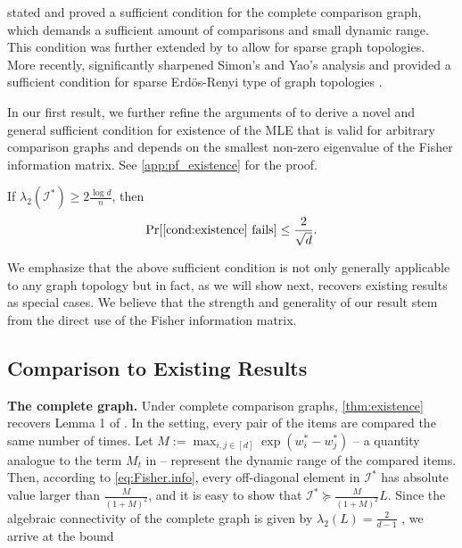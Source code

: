 \citet{simons1999asymptotics} stated and proved a sufficient condition for the complete comparison graph, which demands a sufficient amount of comparisons and small dynamic range. This condition was further  extended by \cite{yan2012sparse} to allow for sparse graph topologies. More recently, \cite{han2020asymptotic} significantly sharpened Simon's and Yao's analysis and provided a sufficient condition for sparse Erd\"{o}s-Renyi type of graph topologies \citep{erdHos1960evolution}. 

In our first result, we further refine the arguments of \citet{simons1999asymptotics} to derive a novel and general sufficient condition for existence of the MLE that is valid for arbitrary comparison graphs and depends on the smallest non-zero eigenvalue of the Fisher information matrix. See \ref{app:pf_existence} for the proof.

\begin{theorem} \label{thm:existence}
If $\lambda_2(\mathcal{I}^*) \geq 2\frac{\log d}{n}$, then 
\begin{equation} \label{eq:existence}
    \Pr[\text{\ref{cond:existence} fails}] \leq \frac{2}{\sqrt{d}}.
\end{equation}

\end{theorem}

We emphasize that the above sufficient condition is not only generally applicable to any graph topology but in fact, as we will show next, recovers existing results as special cases. We believe that the strength and generality of our result stem from  the direct use of the Fisher information matrix.

\subsection{Comparison to Existing Results}

 {\bf The complete graph.} Under complete comparison graphs, \ref{thm:existence} recovers Lemma 1 of \citet{simons1999asymptotics}. In the setting, every pair of the items are compared the same number of times. Let $M := \max_{i,j \in [d]} \exp(w_i^* - w_j^*)$ --  a quantity analogue to the term $M_t$ in \citet{simons1999asymptotics} -- represent the dynamic range of the compared items. Then, according to \ref{eq:Fisher.info}, every off-diagonal element in $\mathcal{I}^*$ has absolute value larger than $\frac{M}{(1+M)^2}$, and it is easy to show that $\mathcal{I}^* \succeq \frac{M}{(1+M)^2}L$. Since the algebraic connectivity of the complete graph is given by $\lambda_2(L) = \frac{2}{d-1}$ \citep{brouwer2011spectra}, we arrive at the bound

